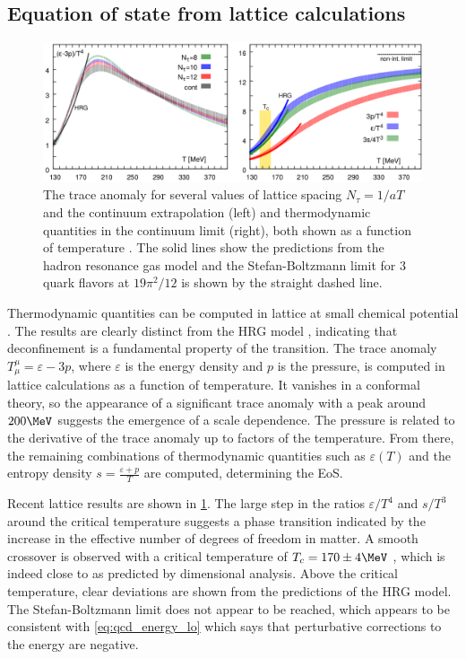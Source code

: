 \subsection{Equation of state from lattice calculations}
\label{subsec:lattice}

\begin{figure}[t]
  \includegraphics[width=\linewidth]{lattice_eos.png}
  \caption{The trace anomaly for several values of lattice spacing $N_\tau = 1/aT$ and the continuum extrapolation (left) and thermodynamic quantities in the continuum limit (right), both shown as a function of temperature \cite{Bazavov:2014pvz}. The solid lines show the predictions from the hadron resonance gas model and the Stefan-Boltzmann limit for 3 quark flavors at $19\pi^2/12$ is shown by the straight dashed line.}
  \label{fig:lattice_eos}
\end{figure}

Thermodynamic quantities can be computed in lattice \qcd at small chemical potential \cite{Borsanyi:2013bia,Bazavov:2014pvz}.
The results are clearly distinct from the \ac{HRG} model \cite{Huovinen:2009yb}, indicating that deconfinement is a fundamental property of the transition.
The trace anomaly $T_\mu^\mu = \varepsilon - 3 p$, where $\varepsilon$ is the energy density and $p$ is the pressure, is computed in lattice calculations as a function of temperature.
It vanishes in a conformal theory, so the appearance of a significant trace anomaly with a peak around $200 \MeV$ suggests the emergence of a scale dependence.
The pressure is related to the derivative of the trace anomaly up to factors of the temperature.
From there, the remaining combinations of thermodynamic quantities such as $\varepsilon(T)$ and the entropy density $s = \frac{\varepsilon + p}{T}$ are computed, determining the \ac{EoS}.

Recent lattice \qcd results are shown in \cref{fig:lattice_eos}.
The large step in the ratios $\varepsilon/T^4$ and $s/T^3$ around the critical temperature suggests a phase transition indicated by the increase in the effective number of degrees of freedom in \qcd matter.
A smooth crossover is observed with a critical temperature of \( T_c = 170 \pm 4 \MeV \) \cite{Aoki:2009sc}, which is indeed close to \lqcd as predicted by dimensional analysis.
Above the critical temperature, clear deviations are shown from the predictions of the \ac{HRG} model.
The Stefan-Boltzmann limit does not appear to be reached, which appears to be consistent with \cref{eq:qcd_energy_lo} which says that perturbative corrections to the energy are negative.


